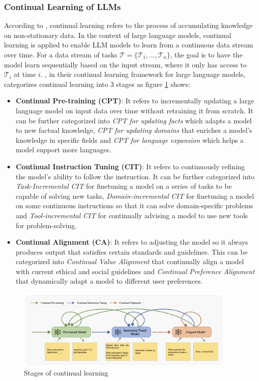 \documentclass[runningheads]{llncs}
\begin{document}
\subsubsection{Continual Learning of LLMs} 
\noindent \newline
According to \cite{Biesi20}, continual learning refers to the process of accumulating knowledge on non-stationary data. In the context of large language models, continual learning is applied to enable LLM models
to learn from a continuous data stream over time. For a data stream of tasks $\mathcal{T}= \{\mathcal{T}_1,\ldots,\mathcal{T}_n \}$, the goal is to
have the model learn sequentially based on the input stream, where it only has access to $\mathcal{T}_i$ at time $i$. \cite{Wu24}, in their continual learning framework for large language models, categorizes 
continual learning into 3 stages as figure \ref{fig:acl_stages} shows:
\begin{itemize}
  \item \textbf{Continual Pre-training (CPT)}: It refers to incrementally updating a large language model on input data over time without retraining it from scratch. It can be further categorized into 
  \textit{CPT for updating facts} which adapts a model to new factual knowledge, \textit{CPT for updating domains} that enriches a model's knowledge in specific fields and \textit{CPT for language expansion} which helps a model
  support more languages.
  \item \textbf{Continual Instruction Tuning (CIT)}: It refers to continuously refining the model's ability to follow the instruction. It can be further categorized into \textit{Task-Incremental CIT} for finetuning a model on a series 
  of tasks to be capable of solving new tasks, \textit{Domain-incremental CIT} for finetuning a model on some continuous instructions so that it can solve domain-specific problems and \textit{Tool-incremental CIT} for 
  continually advising a model to use new tools for problem-solving.
  \item \textbf{Continual Alignment (CA)}: It refers to adjusting the model so it always produces output that satisfies certain standards and guidelines. This can be categorized into \textit{Continual Value Alignment} that continually
  align a model with current ethical and social guidelines and \textit{Continual Preference Alignment} that dynamically adapt a model to different user preferences.
\end{itemize}
\begin{figure}[H]
  \centering
  \includegraphics[width=0.95\textwidth]{CL stages.png}
  \caption{Stages of continual learning \cite{Wu24}}
  \label{fig:acl_stages}
\end{figure} 
\end{document}
